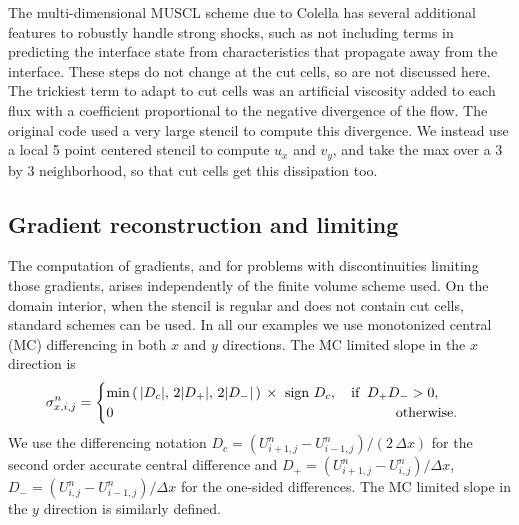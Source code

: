 
The multi-dimensional MUSCL scheme due to Colella has several additional
features to robustly handle strong shocks, such as not including terms in
predicting the interface state from characteristics that propagate 
away from the interface. These
steps do not change at the cut cells, so are not discussed here.  The
trickiest term to adapt to cut cells was an artificial viscosity 
added to each flux with a
coefficient proportional to the negative divergence of the flow.  The original
code used a very large stencil to compute this divergence. We instead use a local 5
point centered stencil to compute $u_x$ and $v_y$, and take the max over a 3 by 3
neighborhood, so that cut cells get this dissipation too.



\subsection{Gradient reconstruction and limiting }\label{sec:limit}

The computation of gradients, and for problems with discontinuities limiting
those gradients, arises independently of the finite volume scheme used. 
On the domain interior, when the stencil is regular and does not contain cut cells, standard schemes can be used.
In all our examples we use monotonized central (MC) differencing in both $x$ and $y$ directions.  The MC limited slope in the $x$ direction is
\begin{equation}
\sigma^n_{x,i,j} =  \begin{cases} 
\min \left ( \,  \lvert{ D_c}\rvert,\,
2 \lvert {D_+}\rvert,\,
2 \lvert{D_-}\rvert \,  \right ) \,\times 
\text{ sign } D_c, \quad \text{if} \;\;  D_+ D_- >  0,\\
0 \hspace*{2.8in} \text{otherwise}.
\end{cases}
\end{equation}
We use the differencing notation
$D_c = (U^n_{i+1,j}-U^n_{i-1,j})/(2 \, \Delta x)$ for the second order accurate central difference and
$D_+ = (U^n_{i+1,j}-U^n_{i,j})/\Delta x$,
$D_- = (U^n_{i,j}-U^n_{i-1,j})/\Delta x$ for the one-sided differences.  The MC limited slope in the $y$ direction is similarly defined.

